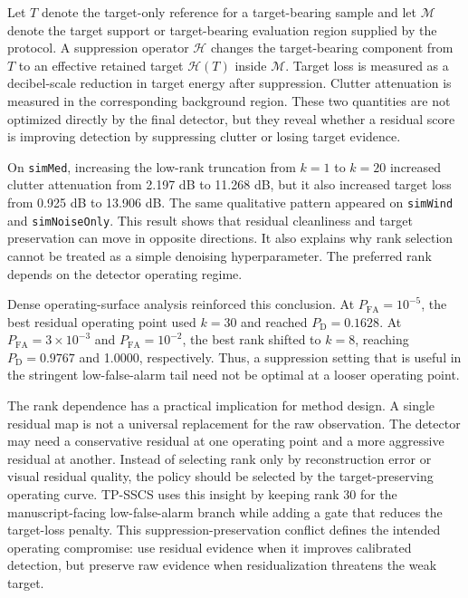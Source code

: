 \documentclass[journal]{IEEEtran}
\begin{document}
Let $T$ denote the target-only reference for a target-bearing sample and let $\mathcal{M}$ denote the target support or target-bearing evaluation region supplied by the protocol. A suppression operator $\mathcal{H}$ changes the target-bearing component from $T$ to an effective retained target $\mathcal{H}(T)$ inside $\mathcal{M}$. Target loss is measured as a decibel-scale reduction in target energy after suppression. Clutter attenuation is measured in the corresponding background region. These two quantities are not optimized directly by the final detector, but they reveal whether a residual score is improving detection by suppressing clutter or losing target evidence.

On \texttt{simMed}, increasing the low-rank truncation from $k=1$ to $k=20$ increased clutter attenuation from 2.197 dB to 11.268 dB, but it also increased target loss from 0.925 dB to 13.906 dB. The same qualitative pattern appeared on \texttt{simWind} and \texttt{simNoiseOnly}. This result shows that residual cleanliness and target preservation can move in opposite directions. It also explains why rank selection cannot be treated as a simple denoising hyperparameter. The preferred rank depends on the detector operating regime.

Dense operating-surface analysis reinforced this conclusion. At $P_{\mathrm{FA}}=10^{-5}$, the best residual operating point used $k=30$ and reached $P_{\mathrm{D}}=0.1628$. At $P_{\mathrm{FA}}=3 \times 10^{-3}$ and $P_{\mathrm{FA}}=10^{-2}$, the best rank shifted to $k=8$, reaching $P_{\mathrm{D}}=0.9767$ and 1.0000, respectively. Thus, a suppression setting that is useful in the stringent low-false-alarm tail need not be optimal at a looser operating point.

The rank dependence has a practical implication for method design. A single residual map is not a universal replacement for the raw observation. The detector may need a conservative residual at one operating point and a more aggressive residual at another. Instead of selecting rank only by reconstruction error or visual residual quality, the policy should be selected by the target-preserving operating curve. TP-SSCS uses this insight by keeping rank 30 for the manuscript-facing low-false-alarm branch while adding a gate that reduces the target-loss penalty. This suppression-preservation conflict defines the intended operating compromise: use residual evidence when it improves calibrated detection, but preserve raw evidence when residualization threatens the weak target.
\end{document}
